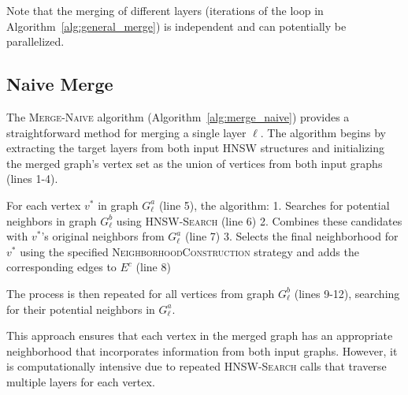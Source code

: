 \documentclass{article}
\begin{document}
Note that the merging of different layers (iterations of the loop in Algorithm~\ref{alg:general_merge}) is independent and can potentially be parallelized.


\subsection{Naive Merge}
The \textsc{Merge-Naive} algorithm (Algorithm~\ref{alg:merge_naive}) provides a straightforward method for merging a single layer $\ell$. The algorithm begins by extracting the target layers from both input HNSW structures and initializing the merged graph's vertex set as the union of vertices from both input graphs (lines 1-4).

For each vertex $v^*$ in graph $G^a_\ell$ (line 5), the algorithm:
1. Searches for potential neighbors in graph $G^b_\ell$ using \textsc{HNSW-Search} (line 6)
2. Combines these candidates with $v^*$'s original neighbors from $G^a_\ell$ (line 7)
3. Selects the final neighborhood for $v^*$ using the specified \textsc{NeighborhoodConstruction} strategy and adds the corresponding edges to $E^c$ (line 8)

The process is then repeated for all vertices from graph $G^b_\ell$ (lines 9-12), searching for their potential neighbors in $G^a_\ell$.

This approach ensures that each vertex in the merged graph has an appropriate neighborhood that incorporates information from both input graphs. However, it is computationally intensive due to repeated \textsc{HNSW-Search} calls that traverse multiple layers for each vertex.
\end{document}
